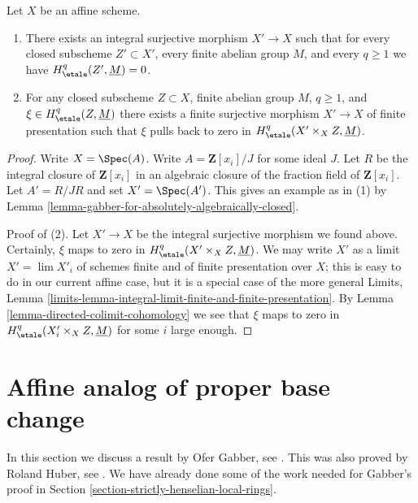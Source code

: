 \begin{lemma}
\label{lemma-integral-cover-trivial-cohomology}
Let $X$ be an affine scheme.
\begin{enumerate}
\item There exists an integral surjective morphism $X' \to X$ such that for
every closed subscheme $Z' \subset X'$, every finite abelian group $M$, and
every $q \geq 1$ we have $H^q_\etale(Z', \underline{M}) = 0$.
\item For any closed subscheme $Z \subset X$, finite abelian group $M$,
$q \geq 1$, and $\xi \in H^q_\etale(Z, \underline{M})$ there exists a
finite surjective morphism $X' \to X$ of finite presentation such that
$\xi$ pulls back to zero in $H^q_\etale(X' \times_X Z, \underline{M})$.
\end{enumerate}
\end{lemma}

\begin{proof}
Write $X = \Spec(A)$. Write $A = \mathbf{Z}[x_i]/J$ for some ideal $J$.
Let $R$ be the integral closure of $\mathbf{Z}[x_i]$ in an algebraic
closure of the fraction field of $\mathbf{Z}[x_i]$. Let
$A' = R/JR$ and set $X' = \Spec(A')$. This gives an example as in (1) by
Lemma \ref{lemma-gabber-for-absolutely-algebraically-closed}.

\medskip\noindent
Proof of (2). Let $X' \to X$ be the integral surjective morphism we found
above. Certainly, $\xi$ maps to zero in
$H^q_\etale(X' \times_X Z, \underline{M})$. We may write $X'$ as a
limit $X' = \lim X'_i$ of schemes finite and of finite presentation
over $X$; this is easy to do in our current affine case, but it
is a special case of the more general Limits, Lemma
\ref{limits-lemma-integral-limit-finite-and-finite-presentation}.
By Lemma \ref{lemma-directed-colimit-cohomology}
we see that $\xi$ maps to zero in $H^q_\etale(X'_i \times_X Z, \underline{M})$
for some $i$ large enough.
\end{proof}










\section{Affine analog of proper base change}
\label{section-gabber-affine-proper}

\noindent
In this section we discuss a result by Ofer Gabber, see
\cite{gabber-affine-proper}. This was also proved by Roland Huber, see
\cite{Huber-henselian}. We have already done some of the work needed
for Gabber's proof in Section \ref{section-strictly-henselian-local-rings}.


